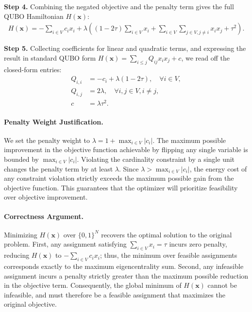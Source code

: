\documentclass[12pt]{article}
\begin{document}
\textbf{Step 4.} Combining the negated objective and the penalty term gives the full QUBO Hamiltonian $H(\mathbf{x})$:
\begin{align}
H(\mathbf{x}) = -\sum_{i \in V} c_i x_i + \lambda \left( (1 - 2\tau) \sum_{i \in V} x_i + \sum_{i \in V} \sum_{j \in V, j \neq i} x_i x_j + \tau^2 \right).
\end{align}

\textbf{Step 5.} Collecting coefficients for linear and quadratic terms, and expressing the result in standard QUBO form $H(\mathbf{x}) = \sum_{i \le j} Q_{ij} x_i x_j + c$, we read off the closed-form entries:
\begin{align}
Q_{i,i} &= -c_i + \lambda(1 - 2\tau), \quad \forall i \in V, \\
Q_{i,j} &= 2\lambda, \quad \forall i, j \in V, i \neq j, \\
c &= \lambda \tau^2.
\end{align}

\paragraph{Penalty Weight Justification.}
We set the penalty weight to $\lambda = 1 + \max_{i \in V} |c_i|$. The maximum possible improvement in the objective function achievable by flipping any single variable is bounded by $\max_{i \in V} |c_i|$. Violating the cardinality constraint by a single unit changes the penalty term by at least $\lambda$. Since $\lambda > \max_{i \in V} |c_i|$, the energy cost of any constraint violation strictly exceeds the maximum possible gain from the objective function. This guarantees that the optimizer will prioritize feasibility over objective improvement.

\paragraph{Correctness Argument.}
Minimizing $H(\mathbf{x})$ over $\{0, 1\}^N$ recovers the optimal solution to the original problem. First, any assignment satisfying $\sum_{i \in V} x_i = \tau$ incurs zero penalty, reducing $H(\mathbf{x})$ to $-\sum_{i \in V} c_i x_i$; thus, the minimum over feasible assignments corresponds exactly to the maximum eigencentrality sum. Second, any infeasible assignment incurs a penalty strictly greater than the maximum possible reduction in the objective term. Consequently, the global minimum of $H(\mathbf{x})$ cannot be infeasible, and must therefore be a feasible assignment that maximizes the original objective.
\end{document}
